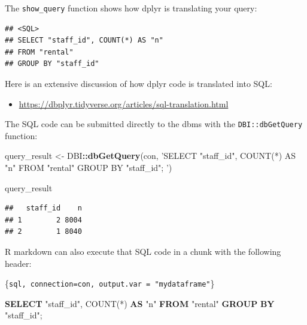 \documentclass[]{book}
\newenvironment{Shaded}{\begin{snugshade}}{\end{snugshade}}
\newcommand{\FunctionTok}[1]{\textcolor[rgb]{0.00,0.00,0.00}{#1}}
\newcommand{\KeywordTok}[1]{\textcolor[rgb]{0.13,0.29,0.53}{\textbf{#1}}}
\newcommand{\NormalTok}[1]{#1}
\newcommand{\OperatorTok}[1]{\textcolor[rgb]{0.81,0.36,0.00}{\textbf{#1}}}
\newcommand{\OtherTok}[1]{\textcolor[rgb]{0.56,0.35,0.01}{#1}}
\newcommand{\StringTok}[1]{\textcolor[rgb]{0.31,0.60,0.02}{#1}}
\providecommand{\tightlist}{%
  \setlength{\itemsep}{0pt}\setlength{\parskip}{0pt}}
\theoremstyle{definition}
\theoremstyle{definition}
\theoremstyle{definition}
\theoremstyle{remark}
\begin{document}
The \texttt{show\_query} function shows how dplyr is translating your
query:

\begin{Shaded}
\end{Shaded}

\begin{verbatim}
## <SQL>
## SELECT "staff_id", COUNT(*) AS "n"
## FROM "rental"
## GROUP BY "staff_id"
\end{verbatim}

Here is an extensive discussion of how dplyr code is translated into
SQL:

\begin{itemize}
\tightlist
\item
  \url{https://dbplyr.tidyverse.org/articles/sql-translation.html}
\end{itemize}

The SQL code can be submitted directly to the dbms with the
\texttt{DBI::dbGetQuery} function:

\begin{Shaded}
\begin{Highlighting}[]
\NormalTok{query_result <-}\StringTok{ }\NormalTok{DBI}\OperatorTok{::}\KeywordTok{dbGetQuery}\NormalTok{(con,}
  \StringTok{'SELECT "staff_id", COUNT(*) AS "n"}
\StringTok{   FROM "rental"}
\StringTok{   GROUP BY "staff_id";}
\StringTok{  '}\NormalTok{)}

\NormalTok{query_result}
\end{Highlighting}
\end{Shaded}

\begin{verbatim}
##   staff_id    n
## 1        2 8004
## 2        1 8040
\end{verbatim}

R markdown can also execute that SQL code in a chunk with the following
header:

\{\texttt{sql,\ connection=con,\ output.var\ =\ "mydataframe"}\}

\begin{Shaded}
\begin{Highlighting}[]
\KeywordTok{SELECT} \OtherTok{"staff_id"}\NormalTok{, }\FunctionTok{COUNT}\NormalTok{(*) }\KeywordTok{AS} \OtherTok{"n"}
\KeywordTok{FROM} \OtherTok{"rental"}
\KeywordTok{GROUP} \KeywordTok{BY} \OtherTok{"staff_id"}\NormalTok{;}
\end{Highlighting}
\end{Shaded}
\end{document}

